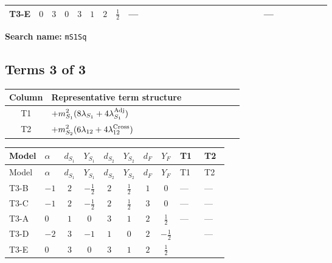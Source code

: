 \documentclass[8pt]{article}
\begin{document}
\begin{landscape}
\begin{longtable}{@{}llcccccc >{\raggedright\arraybackslash}p{0.21\linewidth} >{\raggedright\arraybackslash}p{0.21\linewidth} >{\raggedright\arraybackslash}p{0.21\linewidth}@{}}
\midrule
T3-E & $0$ & $3$ & $0$ & $3$ & $1$ & $2$ & $\frac{1}{2}$ & --- & \scriptsize\adjustbox{max width=\linewidth}{$\begin{gathered} -12 {g_2}^2 {m_{S_1}^2}\end{gathered}$} & --- \\
\midrule
\bottomrule
\end{longtable}
\clearpage
\noindent\textbf{Search name: }\texttt{mS1Sq}\par\smallskip
\subsection*{Terms 3 of 3}
\begin{center}
\begin{tabular}{@{}c >{\raggedright\arraybackslash}p{0.82\linewidth}@{}}
\toprule
Column & Representative term structure \\
\midrule
T1 & \(\displaystyle +{m_{S_1}^2} (8 {\lambda_{S_1}}+4 {\lambda_{S_1}^{\rm Adj}})\) \\
\midrule
T2 & \(\displaystyle +{m_{S_2}^2} (6 {\lambda_{12}}+4 {\lambda_{12}^{\rm Cross}})\) \\
\midrule
\bottomrule
\end{tabular}
\end{center}
\smallskip
\tiny
\begin{longtable}{@{}llcccccc >{\raggedright\arraybackslash}p{0.21\linewidth} >{\raggedright\arraybackslash}p{0.21\linewidth}@{}}
\toprule
Model & $\alpha$ & $d_{S_1}$ & $Y_{S_1}$ & $d_{S_2}$ & $Y_{S_2}$ & $d_F$ & $Y_F$ & T1 & T2 \\
\midrule
\endfirsthead
\toprule
Model & $\alpha$ & $d_{S_1}$ & $Y_{S_1}$ & $d_{S_2}$ & $Y_{S_2}$ & $d_F$ & $Y_F$ & T1 & T2 \\
\midrule
\endhead
T3-B & $-1$ & $2$ & $-\frac{1}{2}$ & $2$ & $\frac{1}{2}$ & $1$ & $0$ & --- & --- \\
\midrule
T3-C & $-1$ & $2$ & $-\frac{1}{2}$ & $2$ & $\frac{1}{2}$ & $3$ & $0$ & --- & --- \\
\midrule
T3-A & $0$ & $1$ & $0$ & $3$ & $1$ & $2$ & $\frac{1}{2}$ & --- & --- \\
\midrule
T3-D & $-2$ & $3$ & $-1$ & $1$ & $0$ & $2$ & $-\frac{1}{2}$ & \scriptsize\adjustbox{max width=\linewidth}{$\begin{gathered} +{m_{S_1}^2} (8 {\lambda_{S_1}}+4 {\lambda_{S_1}^{\rm Adj}})\end{gathered}$} & --- \\
\midrule
T3-E & $0$ & $3$ & $0$ & $3$ & $1$ & $2$ & $\frac{1}{2}$ & \scriptsize\adjustbox{max width=\linewidth}{$\begin{gathered} +{m_{S_1}^2} (8 {\lambda_{S_1}}+4 {\lambda_{S_1}^{\rm Adj}})\end{gathered}$} & \scriptsize\adjustbox{max width=\linewidth}{$\begin{gathered} +{m_{S_2}^2} (6 {\lambda_{12}}+4 {\lambda_{12}^{\rm Cross}})\end{gathered}$} \\

\end{longtable}
\end{landscape}
\end{document}
